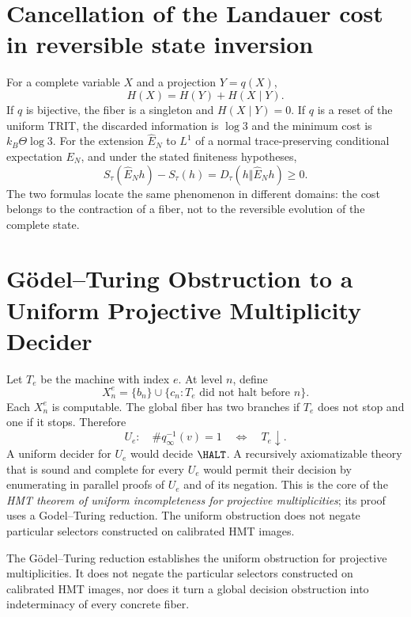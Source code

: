 \section{Cancellation of the Landauer cost in reversible state inversion}

For a complete variable \(X\) and a projection \(Y=q(X)\),
\[
 H(X)=H(Y)+H(X\mid Y).
\]
If \(q\) is bijective, the fiber is a singleton and \(H(X\mid Y)=0\). If \(q\)
is a reset of the uniform TRIT, the discarded information is \(\log3\) and
the minimum cost is \(k_B\Theta\log3\). For the extension
\(\widehat E_N\) to \(L^1\) of a normal trace-preserving conditional expectation
\(E_N\), and under the stated finiteness hypotheses,
\[
 S_\tau(\widehat E_Nh)-S_\tau(h)
 =D_\tau(h\Vert \widehat E_Nh)\ge0.
\]
The two formulas locate the same phenomenon in different domains: the
cost belongs to the contraction of a fiber, not to the reversible evolution
of the complete state.

\section{Gödel–Turing Obstruction to a Uniform Projective Multiplicity Decider}

Let \(T_e\) be the machine with index \(e\). At level \(n\), define
\[
 X_n^e=\{b_n\}\cup
 \{c_n:T_e\text{ did not halt before }n\}.
\]
Each \(X_n^e\) is computable. The global fiber has two branches if \(T_e\) does not
stop and one if it stops. Therefore
\[
 U_e:\quad \#q_\infty^{-1}(v)=1
 \quad\Longleftrightarrow\quad T_e\downarrow.
\]
A uniform decider for \(U_e\) would decide \(\HALT\). A
recursively axiomatizable theory that is sound and complete for every \(U_e\)
would permit their decision by enumerating in parallel proofs of \(U_e\) and of its
negation. This is the core of the \emph{HMT theorem of uniform incompleteness
for projective multiplicities}; its proof uses a
Godel--Turing reduction. The uniform obstruction does not negate particular selectors
constructed on calibrated HMT images.

\begin{controlbox}[title={Scope of the uniform incompleteness control}]
The Gödel--Turing reduction establishes the uniform obstruction for projective multiplicities. It does not negate the particular selectors constructed on calibrated HMT images, nor does it turn a global decision obstruction into indeterminacy of every concrete fiber.
\end{controlbox}
